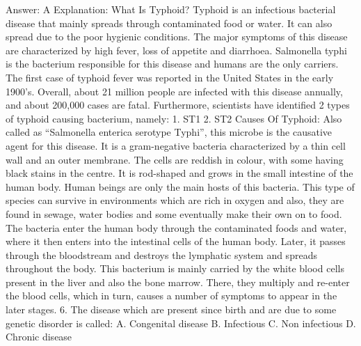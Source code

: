 Answer: A
Explanation: What Is Typhoid? Typhoid is an infectious bacterial disease that mainly spreads through contaminated food or water. It can also spread due to the poor hygienic conditions. The major symptoms of this disease are characterized by high fever, loss of appetite and diarrhoea. Salmonella typhi is the bacterium responsible for this disease and humans are the only carriers. The first case of typhoid fever was reported in the United States in the early 1900’s. Overall, about 21 million people are infected with this disease annually, and about 200,000 cases are fatal. Furthermore, scientists have identified 2 types of typhoid causing bacterium, namely: 1. ST1 2. ST2 Causes Of Typhoid: Also called as “Salmonella enterica serotype Typhi”, this microbe is the causative agent for this disease. It is a gram-negative bacteria characterized by a thin cell wall and an outer membrane. The cells are reddish in colour, with some having black stains in the centre. It is rod-shaped and grows in the small intestine of the human body. Human beings are only the main hosts of this bacteria. This type of species can survive in environments which are rich in oxygen and also, they are found in sewage, water bodies and some eventually make their own on to food. The bacteria enter the human body through the contaminated foods and water, where it then enters into the intestinal cells of the human body. Later, it passes through the bloodstream and destroys the lymphatic system and spreads throughout the body. This bacterium is mainly carried by the white blood cells present in the liver and also the bone marrow. There, they multiply and re-enter the blood cells, which in turn, causes a number of symptoms to appear in the later stages. 6. The disease which are present since birth and are due to some genetic disorder is called: A. Congenital disease B. Infectious C. Non infectious D. Chronic disease 

